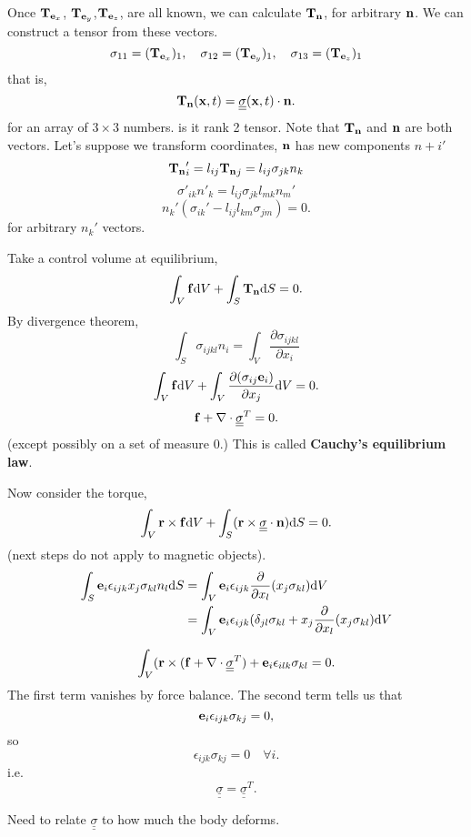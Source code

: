 \documentclass[12pt]{article}
\newcommand{\xx}{{\bf x}}
\newcommand{\ee}{{\bf e}}
\newcommand{\ff}{{\bf f}}
\newcommand{\nn}{{\bf n}}
\newcommand{\rr}{{\bf r}}
\newcommand{\bT}{{\bf T}}
\newcommand{\ssigma}{{\underline{\underline \sigma}}}
\newcommand{\dV}{{\text{d}V}}
\newcommand{\dS}{{\text{d}S}}
\begin{document}
Once $\bT_{\ee_x}$, $\bT_{\ee_y}$,$\bT_{\ee_z}$, are all known, we can calculate $\bT_{\nn}$, for arbitrary $\nn$. We can construct a tensor from these vectors.
\[
\sigma_{11} = (\bT_{\ee_x})_1, \quad \sigma_{12} = (\bT_{\ee_y})_1,\quad \sigma_{13} = (\bT_{\ee_z})_1
\]
that is, 
\[
\bT_{\nn}(\xx,t) = \ssigma(\xx,t)\cdot \nn .
\]
for an array of $3\times 3$ numbers. is it  rank 2 tensor.
Note that $\bT_{\nn}$ and $\nn$ are both vectors. Let's suppose we transform coordinates, $\nn$ has new components $n+i'$ 
\[
{\bT_{\nn}}'_i = l_{ij} {\bT_{\nn}}_j = l_{ij} \sigma_{jk}n_k
\]
\[
\sigma'_{ik}n'_k =  l_{ij} \sigma_{jk} l_{mk}n_m'
\]
\[
n_k'(\sigma_{ik}' - l_{ij}l_{km}\sigma_{jm})=0.
\]
for arbitrary $n_k'$ vectors.

Take a control volume at equilibrium,
\[
\int_V \ff \dV + \int_S \bT_{\nn}\dS = 0.
\]
By  divergence theorem, 
\[
\int_S \sigma_{ijkl}n_i = \int_V \frac{\partial \sigma_{ijkl}}{\partial x_i}
\]
\[
\int_V \ff \dV + \int_V\frac{\partial (\sigma_{ij}\ee_i)}{\partial x_j}\dV = 0.
\]
\[
\ff + \nabla \cdot\ssigma^T = 0.
\]
(except possibly on a set of measure 0.)
This is called {\bf Cauchy's equilibrium law}.

Now consider the torque,
\[
\int_V \rr\times \ff \dV + \int_S (\rr \times \ssigma\cdot \nn)\dS = 0.
\]
(next steps do not apply to magnetic objects).
\begin{align*}
\int_S \ee_i \epsilon_{ijk}x_j\sigma_{kl}n_l\dS &=  \int_V \ee_i \epsilon_{ijk}\frac{\partial}{\partial x_l}(x_j\sigma_{kl}) \dV\\
&= \int_V \ee_i \epsilon_{ijk} ( \delta_{jl}\sigma_{kl} + x_j\frac{\partial}{\partial x_l}(x_j\sigma_{kl}) \dV
\end{align*}

\[
\int_V (\rr\times(\ff+\nabla\cdot\ssigma^T) + \ee_i\epsilon_{ilk}\sigma_{kl}=0.
\]
The first term vanishes by force balance. The second term tells us that 
\[
\ee_i \epsilon_{ijk}\sigma_{kj} = 0,
\]
so 
\[
\epsilon_{ijk}\sigma_{kj} = 0 \quad \forall i.
\]
i.e.
\[
\ssigma = \ssigma^T.
\]

Need to relate $\ssigma$ to how much the body deforms.
\end{document}
